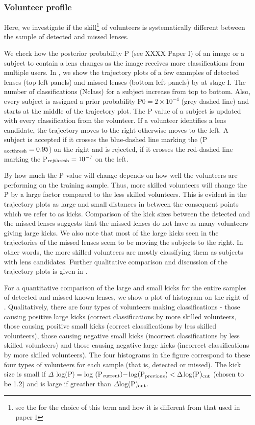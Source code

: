\documentclass[useAMS,usenatbib,a4paper]{mn2e}
\begin{document}
\subsubsection{Volunteer profile}

Here, we investigate if the skill\footnote{see the
 for the choice of this term and how it is
different from that used in paper I} of volunteers is systematically
different between the sample of detected and missed lenses.

We check how the posterior probability P (see XXXX Paper I) of an image
or a subject to contain a lens changes as the image receives more
classifications from multiple users.  In , we show the
trajectory plots of a few examples of detected lenses (top left panels)
and missed lenses (bottom left panels) by \sw at stage I. The number of
classifications (Nclass) for a subject increase from top to bottom.
Also, every subject is assigned a prior probability P0$=2\times10^{-4}$ (grey
dashed line) and starts at the middle of the trajectory plot. The P
value of a subject is updated with every classification from the
volunteer.  If a volunteer identifies a lens candidate, the trajectory
moves to the right otherwise moves to the left. A subject is accepted if it
crosses the blue-dashed line marking the (P$_{\rm acc thresh}=0.95$) on
the right and is rejected, if it crosses the red-dashed line marking the
P$_{\rm rej thresh}=10^{-7}$ on the left.

By how much the P value will change depends on how well the
volunteers are performing on the training sample. Thus, more skilled
volunteers will change the P by a large factor compared to the less
skilled volunteers. This is evident in the trajectory plots as large and
small distances in between the consequent points which we refer to as
kicks. Comparison of the kick sizes between the detected
and the missed lenses suggests that the missed lenses do not have as
many volunteers giving large kicks. We also note that most of the large
kicks seen in the trajectories of the missed lenses seem to be moving
the subjects to the right. In other words, the more skilled volunteers
are mostly classifying them as subjects with lens candidates. Further
qualitative comparison and discussion of the trajectory plots is given
in . 

For a quantitative comparison of the large and small kicks for the
entire samples of detected and missed known lenses, we show a plot of
histogram on the right of . Qualitatively, there are
four types of volunteers making classifications - those causing positive
large kicks (correct classifications by more skilled volunteers, those
causing positive small kicks (correct classifications by less skilled
volunteers), those causing negative small kicks (incorrect
classifications by less skilled volunteers) and those causing negative
large kicks (incorrect classifications by more skilled volunteers). The
four histograms in the figure correspond to these four types of
volunteers for each sample (that is, detected or missed). The kick size
is small if $\Delta$ log(P)$=$log (P$_{\rm current}) - $log(P$_{\rm
previous}) < \Delta$log(P)$_{\rm cut}$ (chosen to be 1.2) and is large
if greather than $\Delta$log(P)$_{\rm cut}$. 
\end{document}
